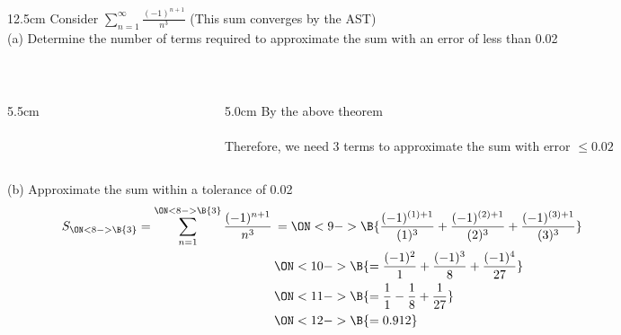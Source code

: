 \begin{frame}
\frametitle{}
\scriptsize

\vspace{0.2cm}

\begin{columns}
\begin{column}{12.5cm}
Consider \quad $\displaystyle{\sum \limits_{n=1}^{\infty} \frac{(-1)^{n+1}}{n^3}}$ \quad (This sum converges by the AST) \\
\vspace{0.2cm}
(a) Determine the number of terms required to approximate the sum with an error of less than 0.02 \\

\vspace{0.2cm}

\vspace{0.2cm}
  \\
\vspace{0.1cm}
\begin{columns}
\begin{column}{5.5cm}
	 \\
	 \\
	 \\
	\onslide<6->{\textcolor{blue}{$a_4 = \frac{1}{(4)^3} \approx 0.016 \le 0.02$\quad ({\em N+1=4 $\implies$ N=3})}}
\end{column}
\begin{column}{5.0cm}
	By the above theorem \\
	\vspace{0.2cm}
	 \\
	\vspace{0.2cm}
	Therefore, we need 3 terms to approximate the sum with error $\le 0.02$
\end{column}
\end{columns}

\vspace{0.5cm}

(b) Approximate the sum within a tolerance of 0.02
\begin{align*}
	S_{\ON<8->{\B{3}}} = \sum \limits_{n=1}^{\ON<8->{\B{3}}} \frac{(-1)^{n+1}}{n^3} &\,= \ON<9->{\B{\frac{(-1)^{(1)+1}}{(1)^3} + \frac{(-1)^{(2)+1}}{(2)^3} + \frac{(-1)^{(3)+1}}{(3)^3}}} \hspace{4.0cm}\\
	&\,\ON<10->{\B{= \frac{(-1)^{2}}{1} + \frac{(-1)^{3}}{8} + \frac{(-1)^{4}}{27}}} \\
	&\,\ON<11->{\B{= \frac{1}{1} - \frac{1}{8} + \frac{1}{27}}} \\
	&\,\ON<12->{\B{= 0.912}}
\end{align*}


\end{column}
\end{columns}
\end{frame}
